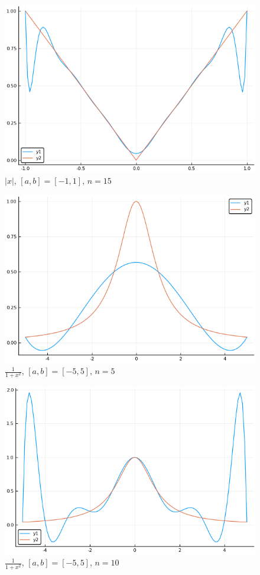 \documentclass{article}
\begin{document}
\begin{figure}[H]
	\includegraphics[width=\linewidth]{zad6a_15.png}
	\caption{$|x|$, $[a,b]=[-1,1]$, $n=15$}
	\label{fig:5a5}
\end{figure}
\begin{figure}[H]
	\includegraphics[width=\linewidth]{zad6b_5.png}
	\caption{$\frac{1}{1+x^2}$, $[a,b]=[-5,5]$, $n=5$}
	\label{fig:5a5}
\end{figure}
\begin{figure}[H]
	\includegraphics[width=\linewidth]{zad6b_10.png}
	\caption{$\frac{1}{1+x^2}$, $[a,b]=[-5,5]$, $n=10$}
	\label{fig:5a5}
\end{figure}
\end{document}
